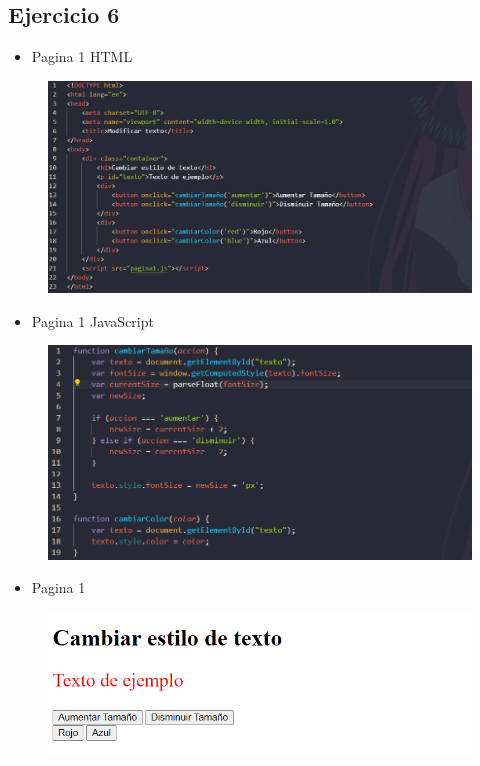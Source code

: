 \documentclass{article}
\begin{document}
	\subsection{Ejercicio 6}
	\begin{itemize}
		\item Pagina 1 HTML
	\end{itemize}
	\begin{figure}[H]
		\centering
		\includegraphics[width=1.0\textwidth, keepaspectratio]{img/pagina1a}
	\end{figure}
	\begin{itemize}
		\item Pagina 1 JavaScript
	\end{itemize}
	\begin{figure}[H]
		\centering
		\includegraphics[width=1.0\textwidth, keepaspectratio]{img/pagina1b}
	\end{figure}
	\begin{itemize}
		\item Pagina 1
	\end{itemize}
	\begin{figure}[H]
		\centering
		\includegraphics[width=1.0\textwidth, keepaspectratio]{img/pagina1c}
	\end{figure}
\end{document}
